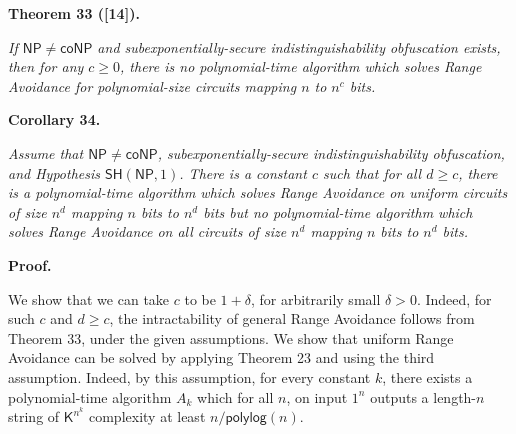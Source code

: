 \documentclass[10pt,a4paper]{article}
\begin{document}


\par\medskip\noindent\textbf{
\textbf{Theorem 33}\textbf{ }([14])\textbf{.}
}\par



\emph{If ${\mathsf{NP}}\neq{\mathsf{coNP}}$ and subexponentially-secure indistinguishability obfuscation exists, then for any $c\geq 0$, there is no polynomial-time algorithm which solves Range Avoidance for polynomial-size circuits mapping $n$ to $n^{c}$ bits.}\par







\par\medskip\noindent\textbf{
\textbf{Corollary 34}\textbf{.}
}\par



\emph{Assume that ${\mathsf{NP}}\neq{\mathsf{coNP}}$, subexponentially-secure indistinguishability obfuscation, and Hypothesis $\mathsf{SH}({\mathsf{NP}},1)$. There is a constant $c$ such that for all $d\geq c$, there is a polynomial-time algorithm which solves Range Avoidance on uniform circuits of size $n^{d}$ mapping $n$ bits to $n^{d}$ bits but no polynomial-time algorithm which solves Range Avoidance on all circuits of size $n^{d}$ mapping $n$ bits to $n^{d}$ bits.}\par






\par\medskip\noindent\textbf{Proof.}\par




We show that we can take $c$ to be $1+\delta$, for arbitrarily small $\delta>0$. Indeed, for such $c$ and $d\geq c$, the intractability of general Range Avoidance follows from Theorem 33, under the given assumptions. We show that uniform Range Avoidance can be solved by applying Theorem 23 and using the third assumption. Indeed, by this assumption, for every constant $k$, there exists a polynomial-time algorithm $A_{k}$ which for all $n$, on input $1^{n}$ outputs a length-$n$ string of ${\mathsf{K}}^{n^{k}}$ complexity at least $n/{\mathsf{polylog}}(n)$.\par
\end{document}

